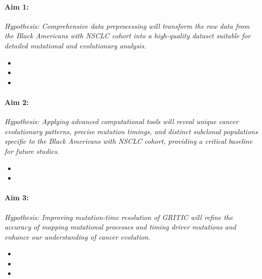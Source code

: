 \vspace{1em}

\paragraph*{Aim 1: \SpecificAimOne} 
\emph{Hypothesis: Comprehensive data preprocessing will transform the raw data from the Black Americans with NSCLC cohort into a high-quality dataset suitable for detailed mutational and evolutionary analysis.}

\begin{itemize}[noitemsep]
    \item \SpecificAimOneA
    \item \SpecificAimOneB
    \item \SpecificAimOneC
\end{itemize}

\paragraph*{Aim 2: \SpecificAimTwo} 
\emph{Hypothesis: Applying advanced computational tools will reveal unique cancer evolutionary patterns, precise mutation timings, and distinct subclonal populations specific to the Black Americans with NSCLC cohort, providing a critical baseline for future studies.}

\begin{itemize}[noitemsep]
    \item \SpecificAimTwoA
    \item \SpecificAimTwoB
\end{itemize}

\paragraph*{Aim 3: \SpecificAimThree} 
\emph{Hypothesis: Improving mutation-time resolution of GRITIC will refine the accuracy of mapping mutational processes and timing driver mutations and enhance our understanding of cancer evolution.}

\begin{itemize}[noitemsep]
    \item \SpecificAimThreeA
    \item \SpecificAimThreeB
    \item \SpecificAimThreeC
\end{itemize}

